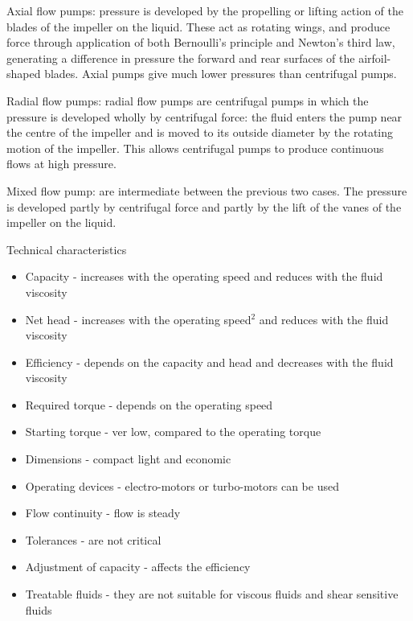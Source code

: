\documentclass[class=report, crop=false, 12pt,a4paper]{standalone}
\begin{document}
Axial flow pumps: pressure is developed by the propelling or lifting action of the blades of the impeller on the liquid. These act as rotating wings, and produce force through application of both Bernoulli's principle and Newton's third law, generating a difference in pressure the forward and rear surfaces of the airfoil-shaped blades. Axial pumps give much lower pressures than centrifugal pumps.

Radial flow pumps: radial flow pumps are centrifugal pumps in which the pressure is developed wholly by centrifugal force: the fluid enters the pump near the centre of the impeller and is moved to its outside diameter by the rotating motion of the impeller. This allows centrifugal pumps to produce continuous flows at high pressure. 

Mixed flow pump: are intermediate between the previous two cases. The pressure is developed partly by centrifugal force and partly by the lift of the vanes of the impeller on the liquid. 

Technical characteristics
\begin{itemize}
  \item Capacity - increases with the operating speed and reduces with the fluid viscosity
  \item Net head - increases with the operating speed$^2$ and reduces with the fluid viscosity
  \item Efficiency - depends on the capacity and head and decreases with the fluid viscosity
  \item Required torque - depends on the operating speed
  \item Starting torque - ver low, compared to the operating torque
  \item Dimensions - compact light and economic
  \item Operating devices - electro-motors or turbo-motors can be used
  \item Flow continuity - flow is steady
  \item Tolerances - are not critical
  \item Adjustment of capacity - affects the efficiency
  \item Treatable fluids - they are not suitable for viscous fluids and shear sensitive fluids
\end{itemize}
\end{document}
